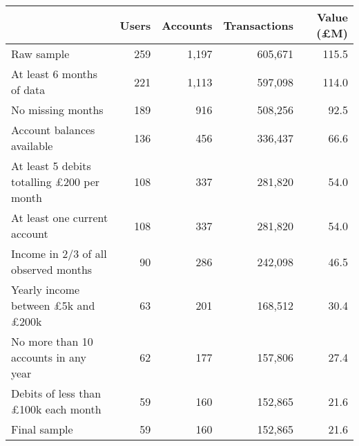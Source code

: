 \begin{tabular}{lrrrr}
\toprule
                                                 & Users & Accounts & Transactions & Value (\pounds M) \\
\midrule
                                      Raw sample &   259 &    1,197 &      605,671 &             115.5 \\
                       At least 6 months of data &   221 &    1,113 &      597,098 &             114.0 \\
                               No missing months &   189 &      916 &      508,256 &              92.5 \\
                      Account balances available &   136 &      456 &      336,437 &              66.6 \\
At least 5 debits totalling \pounds200 per month &   108 &      337 &      281,820 &              54.0 \\
                    At least one current account &   108 &      337 &      281,820 &              54.0 \\
            Income in 2/3 of all observed months &    90 &      286 &      242,098 &              46.5 \\
 Yearly income between \pounds5k and \pounds200k &    63 &      201 &      168,512 &              30.4 \\
            No more than 10 accounts in any year &    62 &      177 &      157,806 &              27.4 \\
      Debits of less than \pounds100k each month &    59 &      160 &      152,865 &              21.6 \\
                                    Final sample &    59 &      160 &      152,865 &              21.6 \\
\bottomrule
\end{tabular}
